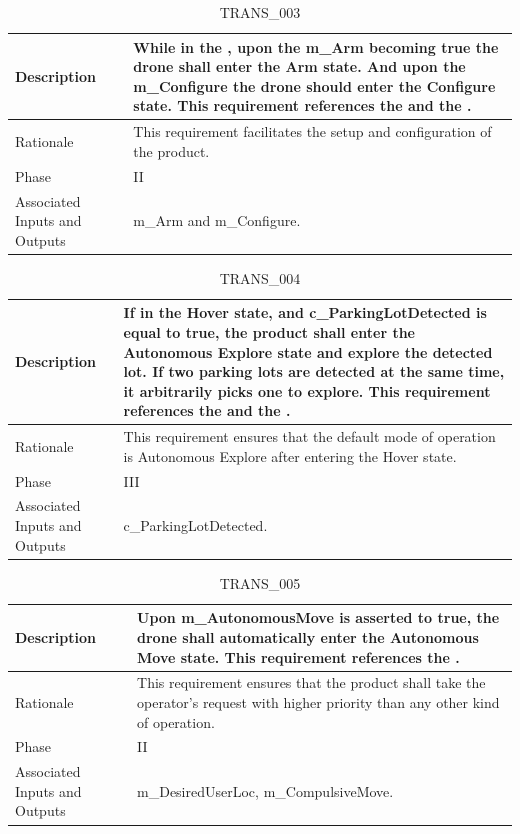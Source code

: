\documentclass{article}
\begin{document}
\begin{table}[!h]
\begin{center}
\caption {TRANS\_003} 
\label{TRANS_003}
\begin{tabular}{ | m{3cm} | m{11cm} | }
\hline
Description & While in the \nameref{Idle State}, upon the m\_Arm becoming true the drone shall enter the Arm state. And upon the m\_Configure the drone should enter the Configure state. This requirement references the \nameref{Arm State} and the \nameref{Configure State}. \\
\hline
Rationale & This requirement facilitates the setup and configuration of the product.  \\
\hline
Phase & II \\
\hline
Associated Inputs and Outputs & m\_Arm and m\_Configure. \\
\hline
\end{tabular}
\end{center}
\end{table}

\begin{table}[!h]
\begin{center}
\caption {TRANS\_004} 
\label{TRANS_004}
\begin{tabular}{ | m{3cm} | m{11cm} | }
\hline
Description & If in the Hover state, and c\_ParkingLotDetected is equal to true, the product shall enter the Autonomous Explore state and explore the detected lot. If two parking lots are detected at the same time, it arbitrarily picks one to explore. This requirement references the \nameref{Hover State} and the \nameref{Autonomous Explore State}. \\
\hline
Rationale & This requirement ensures that the default mode of operation is Autonomous Explore after entering the Hover state.  \\
\hline
Phase & III \\
\hline
Associated Inputs and Outputs & c\_ParkingLotDetected. \\
\hline
\end{tabular}
\end{center}
\end{table}

\begin{table}[!h]
\begin{center}
\caption {TRANS\_005} 
\label{TRANS_005}
\begin{tabular}{ | m{3cm} | m{11cm} | }
\hline
Description & Upon m\_AutonomousMove is asserted to true, the drone shall automatically enter the Autonomous Move state. This requirement references the \nameref{Autonomous Move State}. \\
\hline
Rationale & This requirement ensures that the product shall take the operator's request with higher priority than any other kind of operation. \\
\hline
Phase & II \\
\hline
Associated Inputs and Outputs & m\_DesiredUserLoc, m\_CompulsiveMove. \\
\hline
\end{tabular}
\end{center}
\end{table}
\end{document}
